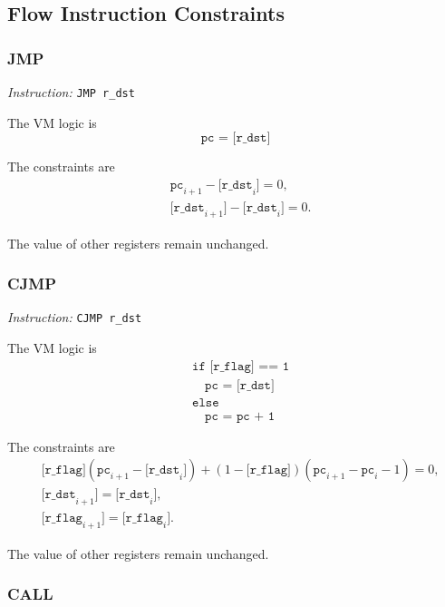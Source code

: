 \subsection{Flow Instruction Constraints}

\subsubsection{JMP}

\emph{Instruction:} \verb|JMP r_dst|

The VM logic is
\[ \texttt{pc = [r\_dst]} \]

The constraints are
\begin{align*}
    & \texttt{pc}_{i+1} - \texttt{[r\_dst}_i\texttt{]} = 0, \\
    & \texttt{[r\_dst}_{i+1}\texttt{]} - \texttt{[r\_dst}_i\texttt{]} = 0.
\end{align*}

The value of other registers remain unchanged.

\subsubsection{CJMP}

\emph{Instruction:} \verb|CJMP r_dst|

The VM logic is
\begin{align*}
    & \texttt{if [r\_flag] == 1} \\
    & \quad \texttt{pc = [r\_dst]} \\
    & \texttt{else} \\
    & \quad \texttt{pc = pc + 1}
\end{align*}

The constraints are
\begin{align*}
    & \texttt{[r\_flag]}(\texttt{pc}_{i+1}-\texttt{[r\_dst}_i\texttt{]}) + (1 - \texttt{[r\_flag]})(\texttt{pc}_{i+1}-\texttt{pc}_i-1) = 0, \\
    & \texttt{[r\_dst}_{i+1}\texttt{]} = \texttt{[r\_dst}_i\texttt{]}, \\
    & \texttt{[r\_flag}_{i+1}\texttt{]} = \texttt{[r\_flag}_i\texttt{]}.
\end{align*}

The value of other registers remain unchanged.

\subsubsection{CALL}

